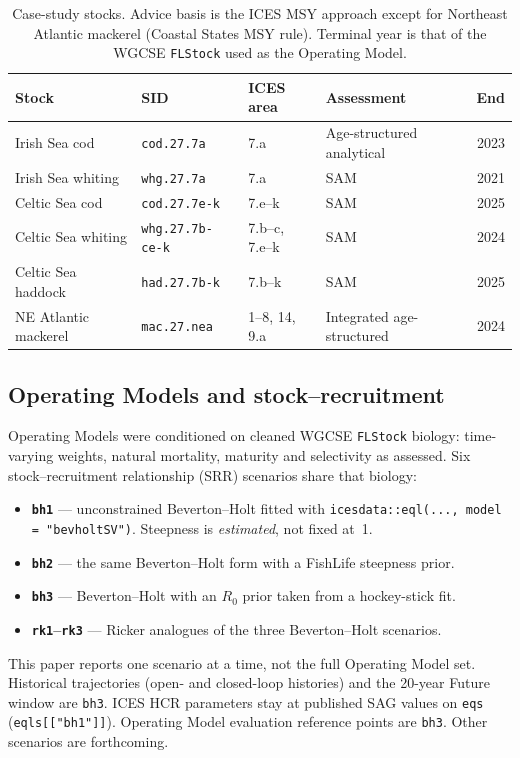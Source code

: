 \documentclass[11pt,a4paper]{article}
\begin{document}
\begin{table}[htbp]
\centering
\caption{Case-study stocks. Advice basis is the ICES MSY approach except
for Northeast Atlantic mackerel (Coastal States MSY rule). Terminal year
is that of the WGCSE \texttt{FLStock} used as the Operating Model.}
\label{tab:stocks}
\begin{tabular}{@{}llllr@{}}
\toprule
Stock & SID & ICES area & Assessment & End \\
\midrule
Irish Sea cod        & \texttt{cod.27.7a}       & 7.a              & Age-structured analytical & 2023 \\
Irish Sea whiting    & \texttt{whg.27.7a}       & 7.a              & SAM                       & 2021 \\
Celtic Sea cod       & \texttt{cod.27.7e-k}     & 7.e--k           & SAM                       & 2025 \\
Celtic Sea whiting   & \texttt{whg.27.7b-ce-k}  & 7.b--c, 7.e--k   & SAM                       & 2024 \\
Celtic Sea haddock   & \texttt{had.27.7b-k}     & 7.b--k           & SAM                       & 2025 \\
NE Atlantic mackerel & \texttt{mac.27.nea}      & 1--8, 14, 9.a    & Integrated age-structured & 2024 \\
\bottomrule
\end{tabular}
\end{table}

\subsection{Operating Models and stock--recruitment}
\label{sec:om}

Operating Models were conditioned on cleaned WGCSE \texttt{FLStock}
biology: time-varying weights, natural mortality, maturity and
selectivity as assessed. Six stock--recruitment relationship (SRR)
scenarios share that biology:
\begin{itemize}
  \item \textbf{\texttt{bh1}} --- unconstrained Beverton--Holt
        \citep{beverton1957dynamics} fitted with
        \texttt{icesdata::eql(..., model = "bevholtSV")}. Steepness is
        \emph{estimated}, not fixed at~1.
  \item \textbf{\texttt{bh2}} --- the same Beverton--Holt form with a
        FishLife steepness prior.
  \item \textbf{\texttt{bh3}} --- Beverton--Holt with an $R_0$ prior
        taken from a hockey-stick fit.
  \item \textbf{\texttt{rk1}--\texttt{rk3}} --- Ricker
        \citep{ricker1954stock} analogues of the three Beverton--Holt
        scenarios.
\end{itemize}
This paper reports one scenario at a time, not the full Operating Model
set. Historical trajectories (open- and closed-loop histories) and the
20-year Future window are \texttt{bh3}. ICES HCR parameters stay at
published SAG values on \texttt{eqs} (\texttt{eqls[["bh1"]]}).
Operating Model evaluation reference points are \texttt{bh3}. Other
scenarios are forthcoming.
\end{document}
